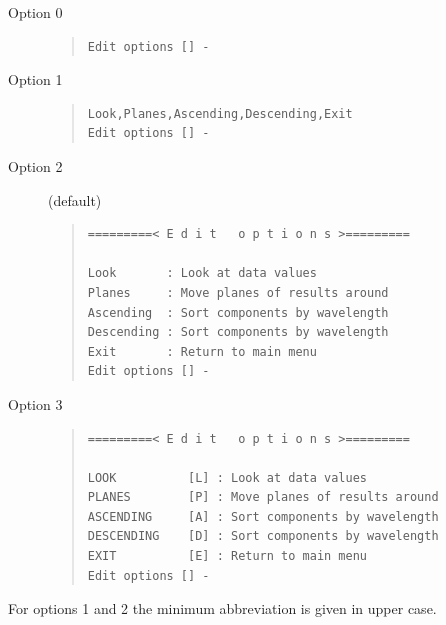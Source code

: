 
\begin{description}
\item[Option 0]\mbox{}

\begin{quote}\begin{verbatim}
Edit options [] -
\end{verbatim}\end{quote}

\item[Option 1]\mbox{}

\begin{quote}\begin{verbatim}
Look,Planes,Ascending,Descending,Exit
Edit options [] -
\end{verbatim}\end{quote}

\item[Option 2] (default)

\begin{quote}\begin{verbatim}
=========< E d i t   o p t i o n s >=========

Look       : Look at data values
Planes     : Move planes of results around
Ascending  : Sort components by wavelength
Descending : Sort components by wavelength
Exit       : Return to main menu
Edit options [] -
\end{verbatim}\end{quote}

\item[Option 3]\mbox{}

\begin{quote}\begin{verbatim}
=========< E d i t   o p t i o n s >=========

LOOK          [L] : Look at data values
PLANES        [P] : Move planes of results around
ASCENDING     [A] : Sort components by wavelength
DESCENDING    [D] : Sort components by wavelength
EXIT          [E] : Return to main menu
Edit options [] -
\end{verbatim}\end{quote}

\end{description}

For options 1 and 2 the minimum abbreviation is given in upper case.

